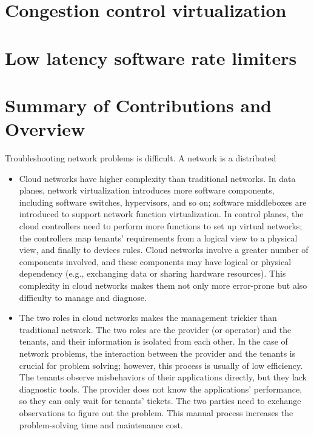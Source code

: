 \section{Congestion control virtualization}
\section{Low latency software rate limiters}



\section{Summary of Contributions and Overview}
\label{sec:intro:challenges}
Troubleshooting network problems is difficult. A network is a distributed

\begin{itemize}
\item Cloud networks have higher complexity than traditional networks.  In data planes, network virtualization introduces more software components, including software switches, hypervisors, and so on; software middleboxes are introduced to support network function virtualization. In control planes, the cloud controllers need to perform more functions to set up virtual networks; the controllers map tenants' requirements from a logical view to a physical view, and finally to devices rules. Cloud networks involve a greater number of components involved, and these components may have logical or physical dependency (e.g., exchanging data or sharing hardware resources). This complexity in cloud networks makes them not only more error-prone but also difficulty to manage and diagnose.
\item The two roles in cloud networks makes the management trickier than traditional network. The two roles are the provider (or operator) and the tenants, and their information is isolated from each
other. In the case of network problems, the interaction between the provider and
the tenants is crucial for problem solving; however, this process is usually of low efficiency. 
The tenants observe misbehaviors of their applications directly, but they lack diagnostic tools.
The provider does not know the applications' performance, so they can only wait for tenants' tickets.
The two parties need to exchange observations to figure out the problem. This manual process increases
the problem-solving time and maintenance cost.

\end{itemize}
